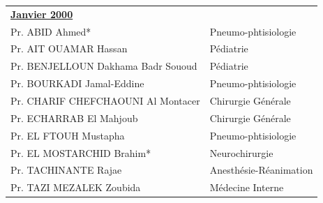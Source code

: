     \begin{table}[H]

      \begin{tabular}{l l}
       \multicolumn{2}{l}{\textbf{\underline{Janvier 2000}}}\vspace*{0.5em}\\
       Pr. ABID Ahmed* & \hspace*{2em} Pneumo-phtisiologie\\
       Pr. AIT OUAMAR Hassan & \hspace*{2em} Pédiatrie  \\
       Pr. BENJELLOUN Dakhama Badr Sououd & \hspace*{2em} Pédiatrie \\
       Pr. BOURKADI Jamal-Eddine	& \hspace*{2em} Pneumo-phtisiologie \\
       Pr. CHARIF CHEFCHAOUNI Al Montacer &  \hspace*{2em} Chirurgie Générale \\
       Pr. ECHARRAB El Mahjoub &  \hspace*{2em} Chirurgie Générale\\
       Pr. EL FTOUH Mustapha &   \hspace*{2em} Pneumo-phtisiologie \\
       Pr. EL MOSTARCHID Brahim* &  \hspace*{2em} Neurochirurgie\\
       Pr. TACHINANTE Rajae &   \hspace*{2em}Anesthésie-Réanimation\\
       Pr. TAZI MEZALEK Zoubida &   \hspace*{2em} Médecine Interne\\
      \end{tabular}
      
      \end{table}

